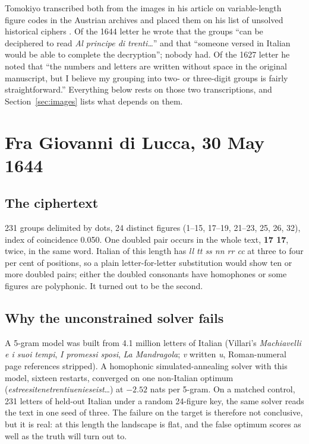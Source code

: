 \documentclass[11pt]{article}
\begin{document}
Tomokiyo transcribed both from the images in his article on variable-length figure codes in the Austrian archives  and placed them on his list of unsolved historical ciphers . Of the 1644 letter he wrote that the groups ``can be deciphered to read \emph{Al principe di trenti\ldots}'' and that ``someone versed in Italian would be able to complete the decryption''; nobody had. Of the 1627 letter he noted that ``the numbers and letters are written without space in the original manuscript, but I believe my grouping into two- or three-digit groups is fairly straightforward.'' Everything below rests on those two transcriptions, and Section~\ref{sec:images} lists what depends on them.

\section{Fra Giovanni di Lucca, 30 May 1644}

\subsection{The ciphertext}

231 groups delimited by dots, 24 distinct figures (1--15, 17--19, 21--23, 25, 26, 32), index of coincidence 0.050. One doubled pair occurs in the whole text, \textbf{17 17}, twice, in the same word. Italian of this length has \emph{ll tt ss nn rr cc} at three to four per cent of positions, so a plain letter-for-letter substitution would show ten or more doubled pairs; either the doubled consonants have homophones or some figures are polyphonic. It turned out to be the second.

\subsection{Why the unconstrained solver fails}

A 5-gram model was built from 4.1 million letters of Italian (Villari's \emph{Machiavelli e i suoi tempi}, \emph{I promessi sposi}, \emph{La Mandragola}; \emph{v} written \emph{u}, Roman-numeral page references stripped). A homophonic simulated-annealing solver with this model, sixteen restarts, converged on one non-Italian optimum (\emph{estreesitenetrentiuenieseist}\ldots) at $-2.52$ nats per 5-gram. On a matched control, 231 letters of held-out Italian under a random 24-figure key, the same solver reads the text in one seed of three. The failure on the target is therefore not conclusive, but it is real: at this length the landscape is flat, and the false optimum scores as well as the truth will turn out to.
\end{document}
